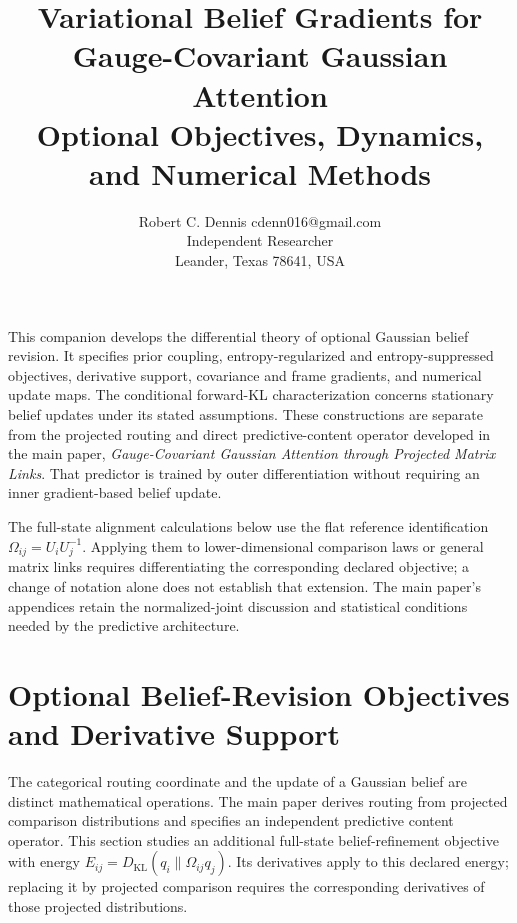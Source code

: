 \documentclass[twoside,11pt]{article}
\begin{document}

\title{Variational Belief Gradients for Gauge-Covariant Gaussian Attention\\[6pt]
\large Optional Objectives, Dynamics, and Numerical Methods}

\author{\name Robert C. Dennis \email cdenn016@gmail.com \\
  \addr Independent Researcher\\
  \addr Leander, Texas 78641, USA}


\maketitle


This companion develops the differential theory of optional Gaussian belief revision. It specifies prior coupling, entropy-regularized and entropy-suppressed objectives, derivative support, covariance and frame gradients, and numerical update maps. The conditional forward-KL characterization concerns stationary belief updates under its stated assumptions. These constructions are separate from the projected routing and direct predictive-content operator developed in the main paper, \emph{Gauge-Covariant Gaussian Attention through Projected Matrix Links}. That predictor is trained by outer differentiation without requiring an inner gradient-based belief update.

The full-state alignment calculations below use the flat reference identification \(\Omega_{ij}=U_iU_j^{-1}\). Applying them to lower-dimensional comparison laws or general matrix links requires differentiating the corresponding declared objective; a change of notation alone does not establish that extension. The main paper's appendices retain the normalized-joint discussion and statistical conditions needed by the predictive architecture.

\renewcommand{\theequation}{G\arabic{equation}}
\renewcommand{\thefigure}{G\arabic{figure}}
\renewcommand{\thetable}{G\arabic{table}}

\section{Optional Belief-Revision Objectives and Derivative Support}
\label{app:optional_belief_revision}

The categorical routing coordinate and the update of a Gaussian belief are distinct mathematical operations. The main paper derives routing from projected comparison distributions and specifies an independent predictive content operator. This section studies an additional full-state belief-refinement objective with energy $E_{ij}=D_{\mathrm{KL}}(q_i\|\Omega_{ij}q_j)$. Its derivatives apply to this declared energy; replacing it by projected comparison requires the corresponding derivatives of those projected distributions.
\end{document}

